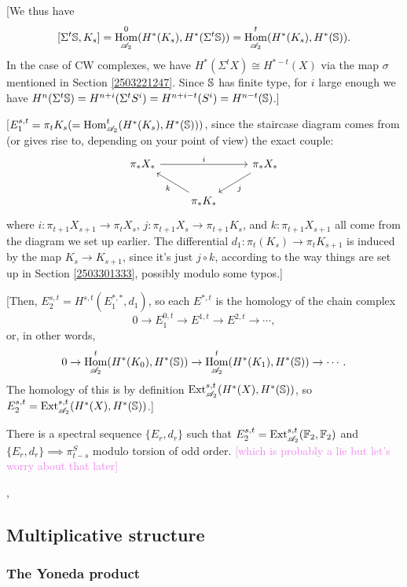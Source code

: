 \documentclass{MetricNotes2023}
\def\bb{\ensuremath\mathbb}
\def\A{\ensuremath{\mathscr{A}_2}}
\DeclareMathOperator{\Ext}{Ext}
\DeclareMathOperator{\Hom}{Hom}
\def\textcolour{\textcolor}
\begin{document}
[We thus have
\[[\Sigma^t \bb{S}, K_s]=\Hom^0_{\A}(H^*(K_s), H^*(\Sigma^t \bb{S}))=\Hom^t_{\A}(H^*(K_s), H^*(\bb{S})).\]
In the case of CW complexes, we have \(H^*(\Sigma^t X)\cong H^{*-t}(X)\) via the map \(\sigma\) mentioned in Section  \ref{2503221247}. Since \(\bb{S}\) has finite type, for \(i\) large enough we have \(H^n(\Sigma^t\bb{S})=H^{n+i}(\Sigma^t S^i)=H^{n+i-t}(S^i)=H^{n-t}(\bb{S})\).]

[\(E_1^{s,t} = \pi_t K_s (=\Hom^t_{\A}(H^*(K_s), H^*(\bb{S})))\), since the staircase diagram comes from (or gives rise to, depending on your point of view) the exact couple:
\[\begin{tikzcd}
 \pi_*X_* \arrow[rr, "i"] & & \pi_* X_* \arrow[dl, "j"] \\ 
 & \pi_*K_* \arrow[ul, "k"] & 
 \end{tikzcd}\]
where \(i : \pi_{t+1}X_{s+1}\to \pi_tX_s\), \(j : \pi_{t+1}X_s \to \pi_{t+1}K_s\), and \(k : \pi_{t+1}X_{s+1}\) all come from the diagram we set up earlier. The differential \(d_1 : \pi_t(K_s)\to\pi_t K_{s+1}\) is induced by the map \(K_s \to K_{s+1}\), since it's just \(j\circ k\), according to the way things are set up in Section \ref{2503301333}, possibly modulo some typos.]

[Then, \(E^{s,t}_2=H^{s,t}(E_1^{*,*}, d_1)\), so each \(E^{*, t}\) is the homology of the chain complex
\[0 \to E^{0,t}_1 \to E^{1,t}\to E^{2,t}\to \cdots,\]
or, in other words,
\[0 \to \Hom^t_{\A}(H^*(K_0), H^*(\bb{S}))\to \Hom^t_{\A}(H^*(K_1), H^*(\bb{S}))\to \cdots.\]
The homology of this is by definition \(\Ext_{\A}^{s,t}(H^*(X), H^*(\bb{S}))\), so \(E_2^{s,t}=\Ext^{s,t}_{\A}(H^*(X), H^*(\bb{S}))\).]

\begin{theorem}\label{2504081125}
There is a spectral sequence \(\{E_r, d_r\}\) such that \(E_2^{s,t}=\Ext_{\A}^{s,t}(\bb{F}_2, \bb{F}_2)\) and \(\{E_r, d_r\}\implies \pi_{t-s}^S\) modulo torsion of odd order. \textcolour{violet}{[which is probably a lie but let's worry about that later]}
\end{theorem}



\autocite{spectral_sequences}, \autocite{hatcher5}

\subsection{Multiplicative structure}

\subsubsection{The Yoneda product}
\end{document}
